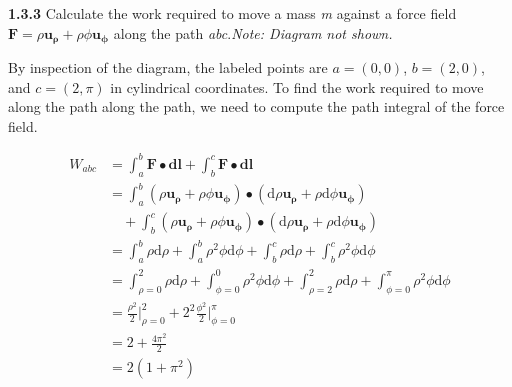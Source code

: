 \documentclass{article}
\begin{document}
\textbf{1.3.3} Calculate the work required to move a mass \textit{m} against a force field $\mathbf{F} =
	\rho\mathbf{u_\rho} + \rho\phi\mathbf{u_\phi}$ along the path \textit{abc}.\@ \textit{Note: Diagram not shown.}

\vspace{24pt}

By inspection of the diagram, the labeled points are $a = (0, 0)$, $b = (2, 0)$, and $c = (2, \pi)$ in cylindrical
coordinates. To find the work required to move along the path along the path, we need to compute the path integral of
the force field.

\begin{equation*}
	\begin{split}
		W_{abc} & = \int_a^b \mathbf{F} \bullet \mathbf{dl} + \int_b^c \mathbf{F} \bullet \mathbf{dl} \\
		& = \int_a^b (\rho\mathbf{u_\rho} + \rho\phi\mathbf{u_\phi}) \bullet (\text{d}\rho\mathbf{u_\rho}+ \rho\text{d}\phi\mathbf{u_\phi}) \\
		& \quad + \int_b^c (\rho\mathbf{u_\rho} + \rho\phi\mathbf{u_\phi}) \bullet (\text{d}\rho\mathbf{u_\rho} + \rho\text{d}\phi\mathbf{u_\phi}) \\
		& = \int_a^b \rho\text{d}\rho + \int_a^b \rho^2\phi\text{d}\phi + \int_b^c \rho\text{d}\rho + \int_b^c \rho^2\phi\text{d}\phi \\
		& = \int_{\rho = 0}^2 \rho\text{d}\rho + \int_{\phi = 0}^0 \rho^2\phi\text{d}\phi + \int_{\rho = 2}^2 \rho\text{d}\rho + \int_{\phi = 0}^\pi \rho^2\phi\text{d}\phi \\
		& = \frac{\rho^2}{2}\biggr\rvert_{\rho = 0}^{2} + 2^2 \frac{\phi^2}{2} \biggr\rvert_{\phi = 0}^{\pi} \\
		& = 2 + \frac{4\pi^2}{2} \\
		& = 2(1 + \pi^2)
	\end{split}
\end{equation*}
\end{document}
